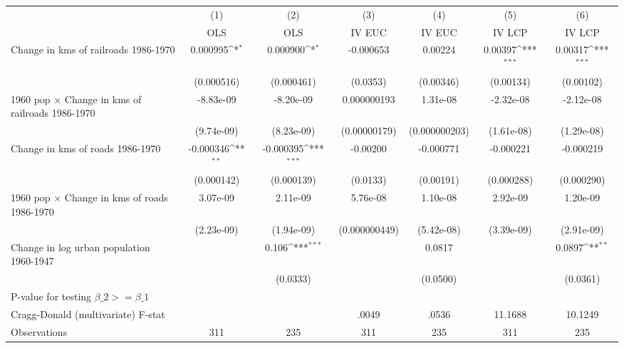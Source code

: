 {
\def\sym#1{\ifmmode^{#1}\else\(^{#1}\)\fi}
\begin{tabular}{l*{6}{c}}
\hline\hline
                &\multicolumn{1}{c}{(1)}&\multicolumn{1}{c}{(2)}&\multicolumn{1}{c}{(3)}&\multicolumn{1}{c}{(4)}&\multicolumn{1}{c}{(5)}&\multicolumn{1}{c}{(6)}\\
                &\multicolumn{1}{c}{OLS}&\multicolumn{1}{c}{OLS}&\multicolumn{1}{c}{IV EUC}&\multicolumn{1}{c}{IV EUC}&\multicolumn{1}{c}{IV LCP}&\multicolumn{1}{c}{IV LCP}\\
\hline
Change in kms of railroads 1986-1970& 0.000995\sym{*}  & 0.000900\sym{*}  &-0.000653         &  0.00224         &  0.00397\sym{***}&  0.00317\sym{***}\\
                &(0.000516)         &(0.000461)         & (0.0353)         &(0.00346)         &(0.00134)         &(0.00102)         \\
[1em]
1960 pop $\times$ Change in kms of railroads 1986-1970&-8.83e-09         &-8.20e-09         &0.000000193         & 1.31e-08         &-2.32e-08         &-2.12e-08         \\
                &(9.74e-09)         &(8.23e-09)         &(0.00000179)         &(0.000000203)         &(1.61e-08)         &(1.29e-08)         \\
[1em]
Change in kms of roads 1986-1970&-0.000346\sym{**} &-0.000395\sym{***}& -0.00200         &-0.000771         &-0.000221         &-0.000219         \\
                &(0.000142)         &(0.000139)         & (0.0133)         &(0.00191)         &(0.000288)         &(0.000290)         \\
[1em]
1960 pop $\times$ Change in kms of roads 1986-1970& 3.07e-09         & 2.11e-09         & 5.76e-08         & 1.10e-08         & 2.92e-09         & 1.20e-09         \\
                &(2.23e-09)         &(1.94e-09)         &(0.000000449)         &(5.42e-08)         &(3.39e-09)         &(2.91e-09)         \\
[1em]
Change in log urban population 1960-1947&                  &    0.106\sym{***}&                  &   0.0817         &                  &   0.0897\sym{**} \\
                &                  & (0.0333)         &                  & (0.0500)         &                  & (0.0361)         \\
\hline
P-value for testing $\beta\_{2} >= \beta\_{1}$&                  &                  &                  &                  &                  &                  \\
Cragg-Donald (multivariate) F-stat&                  &                  &    .0049         &    .0536         &  11.1688         &  10.1249         \\
Observations    &      311         &      235         &      311         &      235         &      311         &      235         \\
\hline\hline
\end{tabular}
}
